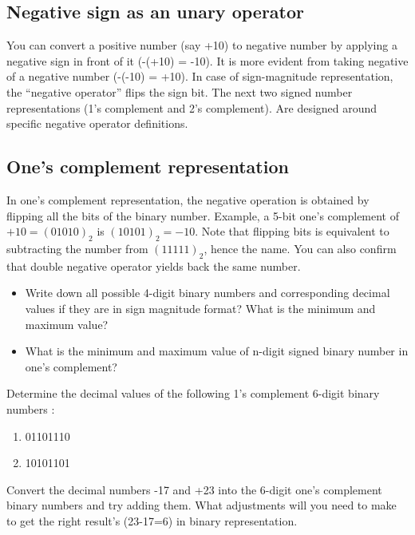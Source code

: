 \subsection{Negative sign as an unary operator}

You can convert a positive number (say +10) to negative number by applying a
negative sign in front of it (-(+10) = -10). It is more evident from taking
negative of a negative number (-(-10) = +10). In case of sign-magnitude
representation, the ``negative operator'' flips the sign bit. The next two
signed number representations (1's complement and 2's complement). Are designed
around specific negative operator definitions.

\subsection{One's complement representation}

In one's complement representation, the negative operation is obtained by flipping
all the bits of the binary number. Example, a 5-bit one's
complement of $+10 = (01010)_2$ is $(10101)_2 = -10$. Note that flipping bits is
equivalent to subtracting the number from $(11111)_2$, hence the name. You can
also confirm that double negative operator yields back the same number.

\begin{prob}
  \begin{itemize}
  \item Write down all possible 4-digit binary numbers and corresponding decimal
    values if they are in sign magnitude format? What is the minimum and maximum value?
  \item What is the minimum and maximum value of n-digit signed binary number in
    one's complement?
  \end{itemize}
\end{prob}
\vspace{20em}

\begin{prob}
  Determine the decimal values of the following 1’s complement 6-digit binary numbers :
  \begin{enumerate}
  \item 01101110
  \item 10101101
  \end{enumerate}
\end{prob}
\vspace{20em}

\begin{prob}
  Convert the decimal numbers -17 and +23 into the 6-digit one's complement binary numbers and try adding them. What
  adjustments will you need to make to get the right result's (23-17=6) in binary representation.
\end{prob}
\vspace{20em}



